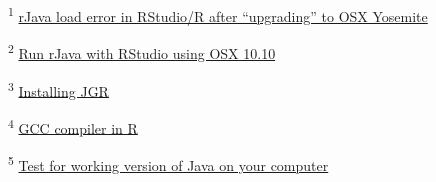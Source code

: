 \documentclass[10,portrait]{article}
\begin{document}
\textsuperscript{1}
\href{https://stackoverflow.com/questions/30738974/rjava-load-error-in-rstudio-r-after-upgrading-to-osx-yosemite}{rJava
load error in RStudio/R after ``upgrading'' to OSX Yosemite}

\textsuperscript{2}
\href{http://paulklemm.com/blog/2015-02-20-run-rjava-with-rstudio-under-osx-10-dot-10/}{Run
rJava with RStudio using OSX 10.10}

\textsuperscript{3} \href{https://github.com/markush81/JGR}{Installing
JGR}

\textsuperscript{4}
\href{https://stackoverflow.com/questions/1616983/building-r-packages-using-alternate-gcc}{GCC
compiler in R}

\textsuperscript{5}
\href{https://stackoverflow.com/questions/14915898/rnetlogo-function-nlstart-fails-to-launch-gui}{Test
for working version of Java on your computer}

\printbibliography
\end{document}
